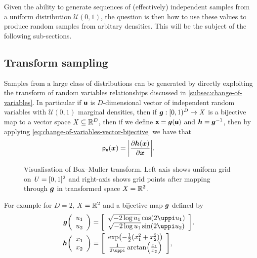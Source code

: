 Given the ability to generate sequences of (effectively) independent samples from a uniform distribution $\mathcal{U}(0,1)$, the question is then how to use these values to produce random samples from arbitary densities. This will be the subject of the following sub-sections.

\subsection{Transform sampling}

Samples from a large class of distributions can be generated by directly exploiting the transform of random variables relationships discussed in \ref{subsec:change-of-variables}. In particular if $\boldsymbol{\mathsf{u}}$ is $D$-dimensional vector of independent random variables with $\mathcal{U}(0,1)$ marginal densities, then if $\boldsymbol{g} :  [0,1)^D \to \mathit{X}$ is a bijective map to a vector space $\mathit{X} \subseteq \mathbb{R}^D$, then if we define $\boldsymbol{\mathsf{x}} = \boldsymbol{g}(\boldsymbol{\mathsf{u}})$ and $\boldsymbol{h} = \boldsymbol{g}^{-1}$, then by applying \eqref{eq:change-of-variables-vector-bijective} we have that
\begin{equation}\label{eq:transform-sampling-uniform}
  \pden{\rvct{x}}(\vct{x}) = \left|\pd{\vct{h}(\vct{x})}{\vct{x}}\right|.
\end{equation}
\begin{figure}[!t]
\def\numgrid{11}
\caption[Visualisation of Box--Muller transform.]{Visualisation of Box--Muller transform. Left axis shows uniform grid on $\mathit{U} = [0,1]^2$ and right-axis shows grid points after mapping through $\boldsymbol{g}$ in transformed space $\mathit{X} = \mathbb{R}^2$.}
\label{fig:box-muller-transform}
\end{figure}
For example for $D=2$, $\mathit{X} = \mathbb{R}^2$ and a bijective map $\boldsymbol{g}$ defined by
\begin{equation}\label{eq:box-muller-transform}
\begin{split}
  \vct{g}\lpa\begin{array}{c} u_1\\u_2\end{array}\rpa &=
  \lsb\begin{array}{c} \sqrt{-2\log u_1}\cos(2\uppi u_1) \\ \sqrt{-2\log u_1}\sin(2\uppi u_2)\end{array}\rsb,
  \\
  \vct{h}\lpa\begin{array}{c} x_1\\x_2\end{array}\rpa &=
  \lsb\begin{array}{c} \exp\lpa-\frac{1}{2}(x_1^2+x_2^2)\rpa \\ \frac{1}{2\uppi}\arctan\lpa\frac{x_1}{x_2}\rpa\end{array}\rsb,
\end{split}
\end{equation}
